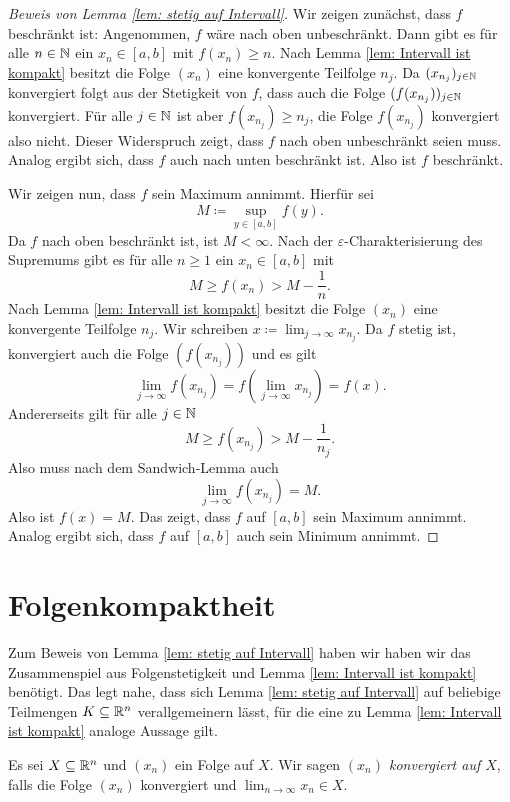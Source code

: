 \documentclass[a4paper,10pt]{article}
\begin{document}
\begin{proof}[Beweis von Lemma \ref{lem: stetig auf Intervall}]
 Wir zeigen zunächst, dass $f$ beschränkt ist: Angenommen, $f$ wäre nach oben unbeschränkt. Dann gibt es für alle $n \in \mathbb{N}$ ein $x_n \in [a,b]$ mit $f(x_n) \geq n$. Nach Lemma \ref{lem: Intervall ist kompakt} besitzt die Folge $(x_n)$ eine konvergente Teilfolge $n_j$. Da $(x_{n_j})_{j \in \mathbb{N}}$ konvergiert folgt aus der Stetigkeit von $f$, dass auch die Folge $(f(x_{n_j}))_{j \in \mathbb{N}}$ konvergiert. Für alle $j \in \mathbb{N}$ ist aber $f(x_{n_j}) \geq n_j$, die Folge $f(x_{n_j})$ konvergiert also nicht. Dieser Widerspruch zeigt, dass $f$ nach oben unbeschränkt seien muss. Analog ergibt sich, dass $f$ auch nach unten beschränkt ist. Also ist $f$ beschränkt.
 
 Wir zeigen nun, dass $f$ sein Maximum annimmt. Hierfür sei
 \[
  M \coloneqq \sup_{y \in [a,b]} f(y).
 \]
 Da $f$ nach oben beschränkt ist, ist $M < \infty$. Nach der $\varepsilon$-Charakterisierung des Supremums gibt es für alle $n \geq 1$ ein $x_n \in [a,b]$ mit
 \[
  M \geq f(x_n) > M - \frac{1}{n}.
 \]
 Nach Lemma \ref{lem: Intervall ist kompakt} besitzt die Folge $(x_n)$ eine konvergente Teilfolge $n_j$. Wir schreiben $x \coloneqq \lim_{j \to \infty} x_{n_j}$. Da $f$ stetig ist, konvergiert auch die Folge $(f(x_{n_j}))$ und es gilt
 \[
  \lim_{j \to \infty} f(x_{n_j})
  = f\left( \lim_{j \to \infty} x_{n_j} \right)
  = f(x).
 \]
 Andererseits gilt für alle $j \in \mathbb{N}$
 \[
  M \geq f(x_{n_j}) > M - \frac{1}{n_j}.
 \]
 Also muss nach dem Sandwich-Lemma auch
 \[
  \lim_{j \to \infty} f(x_{n_j}) = M.
 \]
 Also ist $f(x) = M$. Das zeigt, dass $f$ auf $[a,b]$ sein Maximum annimmt. Analog ergibt sich, dass $f$ auf $[a,b]$ auch sein Minimum annimmt.
\end{proof}





\section{Folgenkompaktheit}


Zum Beweis von Lemma \ref{lem: stetig auf Intervall} haben wir haben wir das Zusammenspiel aus Folgenstetigkeit und Lemma \ref{lem: Intervall ist kompakt} benötigt. Das legt nahe, dass sich Lemma \ref{lem: stetig auf Intervall} auf beliebige Teilmengen $K \subseteq \mathbb{R}^n$ verallgemeinern lässt, für die eine zu Lemma \ref{lem: Intervall ist kompakt} analoge Aussage gilt.


\begin{defi}
 Es sei $X \subseteq \mathbb{R}^n$ und $(x_n)$ ein Folge auf $X$. Wir sagen \emph{$(x_n)$ konvergiert auf $X$}, falls die Folge $(x_n)$ konvergiert und $\lim_{n \to \infty} x_n \in X$.
\end{defi}
\end{document}
